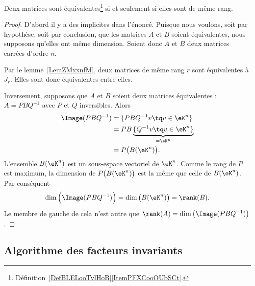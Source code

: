 \begin{corollary}      \label{CorGOUYooErfOIe}
	Deux matrices sont équivalentes\footnote{Définition~\ref{DefBLELooTvlHoB}\ref{ItemPFXCooOUbSCt}.} si et seulement si elles sont de même rang.
\end{corollary}

\begin{proof}
	D'abord il y a des implicites dans l'énoncé. Puisque nous voulons, soit par hypothèse, soit par conclusion, que les matrices \( A\) et \( B\) soient équivalentes, nous supposons qu'elles ont même dimension. Soient donc \( A\) et \( B\) deux matrices carrées d'ordre \( n \).

	Par le lemme~\ref{LemZMxxnfM}, deux matrices de même rang \( r\) sont équivalentes à \( J_r\). Elles sont donc équivalentes entre elles.

	Inversement, supposons que \( A\) et \( B\) soient deux matrices équivalentes : \( A=PBQ^{-1}\) avec \( P\) et \( Q\) inversibles. Alors
	\begin{subequations}
		\begin{align}
			\Image(PBQ^{-1}) & =\{ PBQ^{-1}v\tq v\in \eK^n \}                       \\
			                 & =PB\underbrace{\{ Q^{-1}v\tq v\in \eK^n \}}_{=\eK^n} \\
			                 & =P\big( B(\eK^n) \big).
		\end{align}
	\end{subequations}
	L'ensemble \( B(\eK^n)\) est un sous-espace vectoriel de \( \eK^n\). Comme le rang de \( P\) est maximum, la dimension de \( P\big( B(\eK^n) \big)\) est la même que celle de \( B(\eK^n)\). Par conséquent
	\begin{equation}
		\dim\Big( \Image(PBQ^{-1}) \Big)=\dim\big( B(\eK^n) \big)=\rank(B).
	\end{equation}
	Le membre de gauche de cela n'est autre que \( \rank(A)=\dim\big( \Image(PBQ^{-1}) \big)\).
\end{proof}

\subsection{Algorithme des facteurs invariants}


